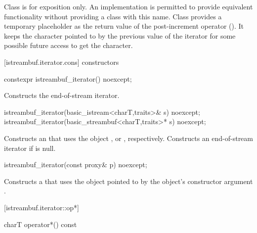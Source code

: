 \pnum
Class
is for exposition only.
An implementation is permitted to provide equivalent functionality without
providing a class with this name.
Class
provides a temporary
placeholder as the return value of the post-increment operator
().
It keeps the character pointed to by the previous value
of the iterator for some possible future access to get the character.

[istreambuf.iterator.cons]{ constructors}


%
\begin{itemdecl}
constexpr istreambuf_iterator() noexcept;
\end{itemdecl}

\begin{itemdescr}
\pnum
\effects
Constructs the end-of-stream iterator.
\end{itemdescr}


%
\begin{itemdecl}
istreambuf_iterator(basic_istream<charT,traits>& s) noexcept;
istreambuf_iterator(basic_streambuf<charT,traits>* s) noexcept;
\end{itemdecl}

\begin{itemdescr}
\pnum
\effects
Constructs an
that uses the
object
,
or
,
respectively.
Constructs an end-of-stream iterator if
is null.
\end{itemdescr}


%
\begin{itemdecl}
istreambuf_iterator(const proxy& p) noexcept;
\end{itemdecl}

\begin{itemdescr}
\pnum
\effects
Constructs a
that uses the
object pointed to by the
object's constructor argument .
\end{itemdescr}

[istreambuf.iterator::op*]{}

%
\begin{itemdecl}
charT operator*() const
\end{itemdecl}

